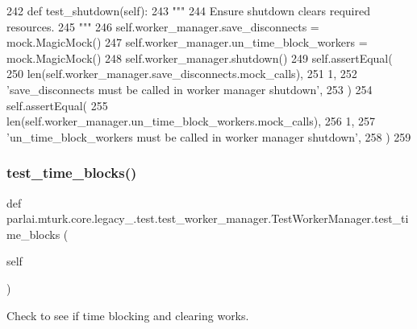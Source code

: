 \begin{DoxyCode}
242     \textcolor{keyword}{def }test\_shutdown(self):
243         \textcolor{stringliteral}{"""}
244 \textcolor{stringliteral}{        Ensure shutdown clears required resources.}
245 \textcolor{stringliteral}{        """}
246         self.worker\_manager.save\_disconnects = mock.MagicMock()
247         self.worker\_manager.un\_time\_block\_workers = mock.MagicMock()
248         self.worker\_manager.shutdown()
249         self.assertEqual(
250             len(self.worker\_manager.save\_disconnects.mock\_calls),
251             1,
252             \textcolor{stringliteral}{'save\_disconnects must be called in worker manager shutdown'},
253         )
254         self.assertEqual(
255             len(self.worker\_manager.un\_time\_block\_workers.mock\_calls),
256             1,
257             \textcolor{stringliteral}{'un\_time\_block\_workers must be called in worker manager shutdown'},
258         )
259 
\end{DoxyCode}
\mbox{\label{classparlai_1_1mturk_1_1core_1_1legacy__2018_1_1test_1_1test__worker__manager_1_1TestWorkerManager_a815c23442cf90f83d18391139a774e10}} 
\subsubsection{\texorpdfstring{test\+\_\+time\+\_\+blocks()}{test\_time\_blocks()}}
{\footnotesize\ttfamily def parlai.\+mturk.\+core.\+legacy\+\_.\+test.\+test\+\_\+worker\+\_\+manager.\+Test\+Worker\+Manager.\+test\+\_\+time\+\_\+blocks (\begin{DoxyParamCaption}\item[{}]{self }\end{DoxyParamCaption})}

\begin{DoxyVerb}Check to see if time blocking and clearing works.
\end{DoxyVerb}
 


